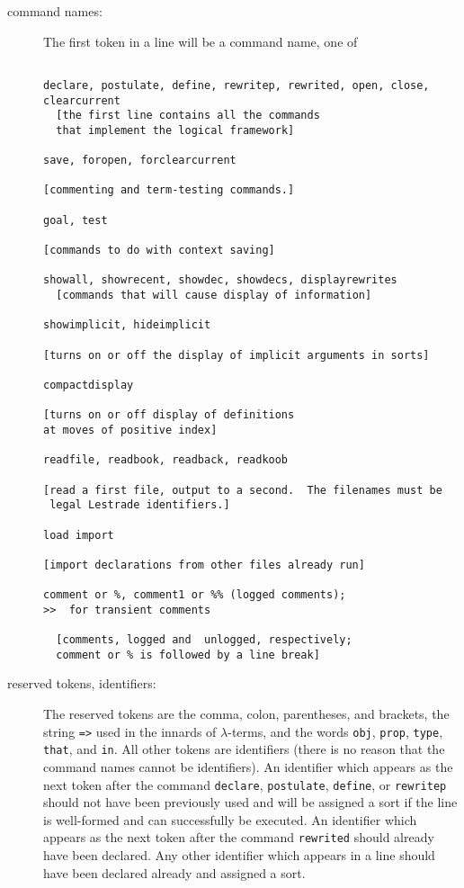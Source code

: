 \documentclass[12pt]{article}
\begin{document}
\begin{description}
\item[command names:]  The first token in a line will be a command name, one of

     \begin{verbatim}

declare, postulate, define, rewritep, rewrited, open, close, clearcurrent  
  [the first line contains all the commands 
  that implement the logical framework]

save, foropen, forclearcurrent

[commenting and term-testing commands.]

goal, test

[commands to do with context saving]

showall, showrecent, showdec, showdecs, displayrewrites
  [commands that will cause display of information]

showimplicit, hideimplicit

[turns on or off the display of implicit arguments in sorts]

compactdisplay

[turns on or off display of definitions 
at moves of positive index]

readfile, readbook, readback, readkoob

[read a first file, output to a second.  The filenames must be
 legal Lestrade identifiers.]

load import

[import declarations from other files already run]

comment or %, comment1 or %% (logged comments);
>>  for transient comments 

  [comments, logged and  unlogged, respectively; 
  comment or % is followed by a line break]

\end{verbatim}

\item[reserved tokens, identifiers:]  The reserved tokens are the comma, colon, parentheses, and brackets, the string {\tt =>} used in the innards of $\lambda$-terms, and the words {\tt obj}, {\tt prop}, {\tt type}, {\tt that}, and {\tt in}.   All other
tokens are identifiers (there is no reason that the command names cannot be identifiers).  An identifier which appears as the next token after the command {\tt declare}, {\tt postulate}, {\tt define}, or {\tt rewritep} should not have been previously
used and will be assigned a sort if the line is well-formed and can successfully be executed.   An identifier which appears as the next token after the command {\tt rewrited}  should already have been declared.  Any other identifier which appears in a line should have been declared already
and assigned a sort.


\end{description}
\end{document}

